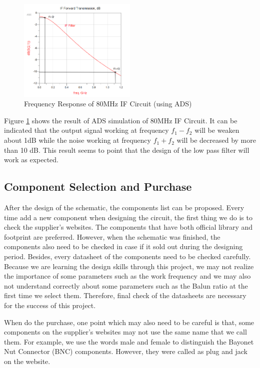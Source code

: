 \documentclass[12pt, a4paper]{report}
\begin{document}
\begin{figure}[htbp]     \begin{centering}
    \includegraphics[width=0.5\textwidth]{img/sim1.png}
    \caption{\label{Fig:sim1}Frequency Response of 80MHz IF Circuit (using ADS)}
    \end{centering}
    
\end{figure}

Figure \ref{Fig:sim1} shows the result of ADS simulation of 80MHz IF Circuit. It can be indicated that the output signal working at frequency $f_{1}-f_{2}$ will be weaken about 1dB while the noise working at frequency $f_{1}+f_{2}$ will be decreased by more than 10 dB. This result seems to point that the design of the low pass filter will work as expected.


\subsection{Component Selection and Purchase}

After the design of the schematic, the components list can be proposed. Every time add a new component when designing the circuit, the first thing we do is to check the supplier's websites. The components that have both official library and footprint are preferred. However, when the schematic was finished, the components also need to be checked in case if it sold out during the designing period. Besides, every datasheet of the components need to be checked carefully. Because we are learning the design skills through this project, we may not realize the importance of some parameters such as the work frequency and we may also not understand correctly about some parameters such as the Balun ratio at the first time we select them. Therefore, final check of the datasheets are necessary for the success of this project.

When do the purchase, one point which may also need to be careful is that, some components on the supplier's websites may not use the same name that we call them. For example, we use the words male and female to distinguish the Bayonet Nut Connector (BNC) components. However, they were called as plug and jack on the website.
\end{document}
